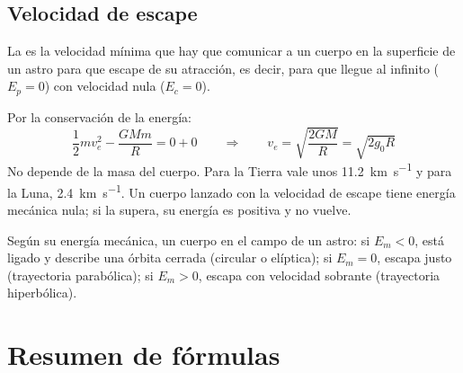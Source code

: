 \subsection{Velocidad de escape}\label{subsec:grav-escape}

\begin{definition}
    La  es la velocidad mínima que hay que comunicar a un cuerpo en la superficie de un astro
    para que escape de su atracción, es decir, para que llegue al infinito (\(E_p = 0\)) con velocidad nula (\(E_c = 0\)).
\end{definition}
Por la conservación de la energía:
\begin{equation*}
    \dfrac{1}{2}m v_e^2 - \dfrac{G M m}{R} = 0 + 0 \qquad\Rightarrow\qquad \boxed{v_e = \sqrt{\dfrac{2 G M}{R}} = \sqrt{2 g_0 R}}
\end{equation*}
No depende de la masa del cuerpo. Para la Tierra vale unos \qty{11.2}{\km\per\second} y para la Luna, \qty{2.4}{\km\per\second}.
Un cuerpo lanzado con la velocidad de escape tiene energía mecánica nula; si la supera, su energía es positiva y no vuelve.

\begin{remark}
    Según su energía mecánica, un cuerpo en el campo de un astro: si \(E_m < 0\), está ligado y describe una órbita cerrada
    (circular o elíptica); si \(E_m = 0\), escapa justo (trayectoria parabólica); si \(E_m > 0\), escapa con velocidad sobrante
    (trayectoria hiperbólica).
\end{remark}

\section{Resumen de fórmulas}\label{sec:grav-resumen}

